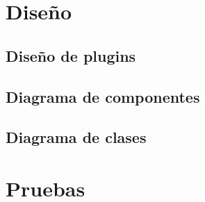 
\chapter{Diseño}
\section{Diseño de plugins}
\section{Diagrama de componentes}
\section{Diagrama de clases}

\chapter{Pruebas}

    
    
    
    
    

    
    
    
    

    
    

    

